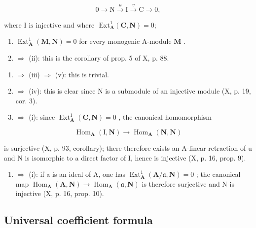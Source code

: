 \[
0 \rightarrow \mathrm{N} \xrightarrow {u} \mathrm{I} \xrightarrow {v} \mathrm{C} \rightarrow 0,
\]

\(\text{where I is injective and where } \text{ Ext}_{\mathbf{A}}^{1} (\mathbf{C}, \mathbf{N}) = 0;\)

\begin{enumerate}
\def\labelenumi{(\alph{enumi})}
\setcounter{enumi}{21}
\item
  \(\operatorname{Ext}_{\mathbf{A}}^{1}(\mathbf{M},\mathbf{N}) = 0\) for every monogenic A-module \(\mathbf{M}\) .
\item
  \(\Rightarrow\) (ii): this is the corollary of prop. 5 of X, p. 88.
\end{enumerate}

\begin{enumerate}
\def\labelenumi{(\roman{enumi})}
\setcounter{enumi}{1}
\item
  \(\Rightarrow\) (iii) \(\Rightarrow\) (v): this is trivial.
\item
  \(\Rightarrow\) (iv): this is clear since N is a submodule of an injective module (X, p. 19, cor. 3).
\item
  \(\Rightarrow\) (i): since \(\operatorname{Ext}_{\mathbf{A}}^{1}(\mathbf{C},\mathbf{N}) = 0\) , the canonical homomorphism
\end{enumerate}

\[
\operatorname{Hom} _ {\mathbf {A}} (\mathrm{I}, \mathbf {N}) \rightarrow \operatorname{Hom} _ {\mathbf {A}} (\mathbf {N}, \mathbf {N})
\]

is surjective (X, p. 93, corollary); there therefore exists an A-linear retraction of u and N is isomorphic to a direct factor of I, hence is injective (X, p. 16, prop. 9).

\begin{enumerate}
\def\labelenumi{(\alph{enumi})}
\setcounter{enumi}{21}
\tightlist
\item
  \(\Rightarrow\) (i): if a is an ideal of A, one has \(\operatorname{Ext}_{\mathbf{A}}^{1}(\mathbf{A}/\mathfrak{a},\mathbf{N})=0\) ; the canonical map \(\operatorname{Hom}_{\mathbf{A}}(\mathbf{A},\mathbf{N})\to\operatorname{Hom}_{\mathbf{A}}(\mathfrak{a},\mathbf{N})\) is therefore surjective and N is injective (X, p. 16, prop. 10).
\end{enumerate}

\subsection{Universal coefficient formula}

